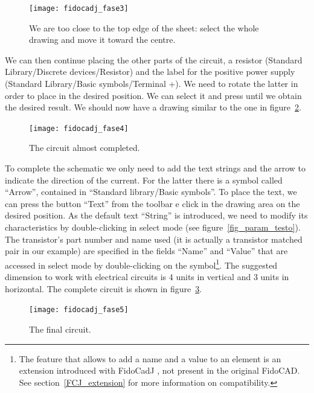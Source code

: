 \documentclass[10pt,a4paper,twoside]{scrreprt}
\newcommand{\keyevidence}[1]{\fbox{#1}}
\begin{document}
%
\begin{figure}
\texttt{[image: fidocadj\_fase3]}
\caption{We are too close to the top edge of the sheet: select the whole
drawing and move it toward the centre.}

\label{fig_fidocadj_fase3}
\end{figure}

We can then continue placing the other parts of the circuit, a resistor (Standard Library/Discrete devices/Resistor)
and the label for the positive power supply (Standard Library/Basic symbols/Terminal +). We need to rotate the latter in order to
place in the desired position. We can select it and press \keyevidence{R}
until we obtain the desired result. We should now have a drawing
similar to the one in figure~\ref{fig_fidocadj_fase4}.

%
\begin{figure}
\texttt{[image: fidocadj\_fase4]}
\caption{The circuit almost completed.}

\label{fig_fidocadj_fase4}
\end{figure}

To complete the schematic we only need to add the text strings and
the arrow to indicate the direction of the current. For the latter
there is a symbol called ``Arrow'', contained in ``Standard library/Basic symbols''. To place the text, we can press the
button ``Text'' from the toolbar e click in the drawing
area on the desired position. As the default text ``String''
is introduced, we need to modify its characteristics by double-clicking
in select mode (see figure~\ref{fig_param_testo}). The transistor's
part number and name used (it is actually a transistor matched pair
in our example) are specified in the fields ``Name'' and ``Value''
that are accessed in select mode by double-clicking on the symbol\footnote{The feature that allows to add a name and a value to an element is an extension introduced with FidoCadJ
, not present in the original FidoCAD.
See section~\ref{FCJ_extension} for more information on compatibility.}. The suggested dimension to work with electrical circuits is 4 units
in vertical and 3 units in horizontal. The complete circuit is shown
in figure~\ref{fig_fidocadj_fase5}.

%
\begin{figure}
\texttt{[image: fidocadj\_fase5]}
\caption{The final circuit.}
\label{fig_fidocadj_fase5}
\end{figure}
\end{document}
